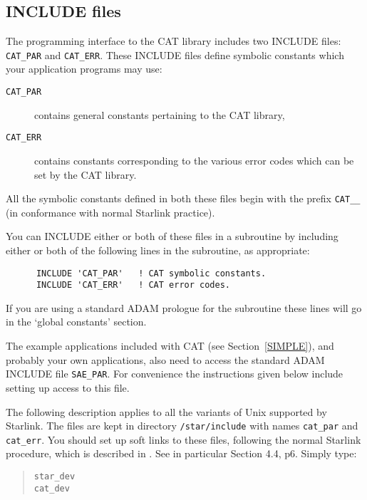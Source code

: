 \subsection{\label{INCLUDE}INCLUDE files}

The programming interface to the CAT library includes two INCLUDE files:
{\tt CAT\_PAR} and {\tt CAT\_ERR}. These INCLUDE files define symbolic
constants which your application programs may use:

\begin{description}

  \item[{\tt CAT\_PAR}] contains general constants pertaining to the
   CAT library,

  \item[{\tt CAT\_ERR}] contains constants corresponding to the various
   error codes which can be set by the CAT library.

\end{description}

All the symbolic constants defined in both these files begin with the
prefix {\tt CAT\_\_} (in conformance with normal Starlink practice).

You can INCLUDE either or both of these files in a subroutine by
including either or both of the following lines in the subroutine,
as appropriate:

\begin{verbatim}
      INCLUDE 'CAT_PAR'   ! CAT symbolic constants.
      INCLUDE 'CAT_ERR'   ! CAT error codes.
\end{verbatim}

If you are using a standard ADAM prologue for the subroutine these
lines will go in the `global constants' section.

The example applications included with CAT (see Section~\ref{SIMPLE}),
and probably your own applications, also need to access the standard
ADAM INCLUDE file {\tt SAE\_PAR}. For convenience the instructions
given below include setting up access to this file.

The following description applies to all the variants of Unix supported
by Starlink.  The files are kept in
directory {\tt /star/include} with names {\tt cat\_par} and {\tt
cat\_err}. You should set up soft links to these files, following the
normal Starlink procedure, which is described in
\cite{SUN111}.  See in particular Section 4.4,
p6.  Simply type:

\begin{verse}
  {\tt star\_dev \\
  cat\_dev}
\end{verse}

